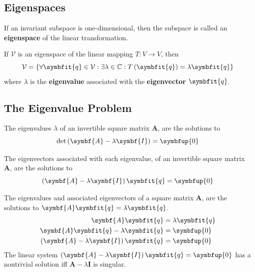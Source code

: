 \documentclass{article}
\begin{document}
\subsection{Eigenspaces}
\begin{definition}
    If an invariant subspace is one-dimensional, then the subspace is
    called an \textbf{eigenspace} of the linear transformation.
\end{definition}
\begin{theorem}
    If \(\mathcal{V}\) is an eigenspace of the linear mapping
    \(T: V \rightarrow V\), then
    \begin{equation*}
        \mathcal{V} = \left\{ \forall \symbfit{q}\in \mathcal{V}:\exists \lambda \in \mathbb{C}:T\left(\symbfit{q}\right)=\lambda \symbfit{q} \right\}
    \end{equation*}
    where \(\lambda\) is the \textbf{eigenvalue} associated with the
    \textbf{eigenvector} \(\symbfit{q}\).
\end{theorem}
\subsection{The Eigenvalue Problem}
\begin{theorem}
    The eigenvalues \(\lambda\) of an invertible square matrix
    \(\symbf{A}\), are the solutions to
    \begin{equation*}
        \det{\left( \symbf{A} - \lambda \symbf{I} \right)}=\symbfup{0}
    \end{equation*}
\end{theorem}
\begin{theorem}
    The eigenvectors associated with each eigenvalue, of an invertible
    square matrix \(\symbf{A}\), are the solutions to
    \begin{equation*}
        \left( \symbf{A} - \lambda \symbf{I} \right) \symbfit{q}=\symbfup{0}
    \end{equation*}
\end{theorem}
\begin{solution}[Proof]
    The eigenvalues and associated eigenvectors of a square matrix
    \(\symbf{A}\), are the solutions to
    \(\symbf{A}\symbfit{q}=\lambda \symbfit{q}\).
    \begin{align*}
        \symbf{A}\symbfit{q}                                      & =\lambda \symbfit{q} \\
        \symbf{A}\symbfit{q} - \lambda \symbfit{q}                & =\symbfup{0}         \\
        \left( \symbf{A} - \lambda \symbf{I} \right) \symbfit{q} & =\symbfup{0}
    \end{align*}
    The linear system
    \(\left( \symbf{A} - \lambda\symbf{I} \right) \symbfit{q}=\symbfup{0}\)
    has a nontrivial solution iff \(\symbf{A} - \lambda \symbf{I}\)
    is singular.
\end{solution}
\end{document}
